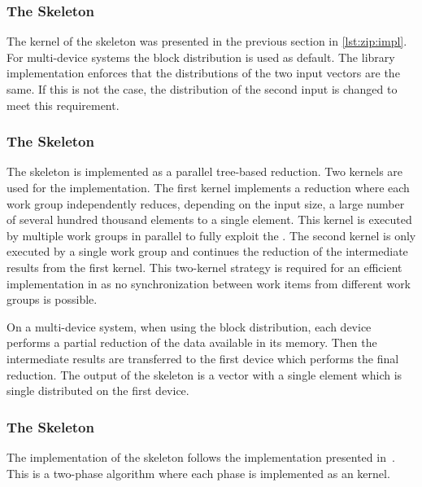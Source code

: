 




\subsubsection{The \zip Skeleton}
The \OpenCL kernel of the \zip skeleton was presented in the previous section in \autoref{lst:zip:impl}.
For multi-device systems the block distribution is used as default.
The \SkelCL library implementation enforces that the distributions of the two input vectors are the same.
If this is not the case, the distribution of the second input is changed to meet this requirement.





\subsubsection{The \reduce Skeleton}
The \reduce skeleton is implemented as a parallel tree-based reduction.
Two \OpenCL kernels are used for the implementation.
The first kernel implements a reduction where each work group independently reduces, depending on the input size, a large number of several hundred thousand elements to a single element.
This kernel is executed by multiple work groups in parallel to fully exploit the \GPU.
The second kernel is only executed by a single work group and continues the reduction of the intermediate results from the first kernel.
This two-kernel strategy is required for an efficient implementation in \OpenCL as no synchronization between work items from different work groups is possible.

On a multi-device system, when using the block distribution, each device performs a partial reduction of the data available in its memory.
Then the intermediate results are transferred to the first device which performs the final reduction.
The output of the \reduce skeleton is a vector with a single element which is single distributed on the first device.





\subsubsection{The \scan Skeleton}
The implementation of the \scan skeleton follows the implementation presented in~\cite{HarrisSeOw2007}.
This is a two-phase algorithm where each phase is implemented as an \OpenCL kernel.

